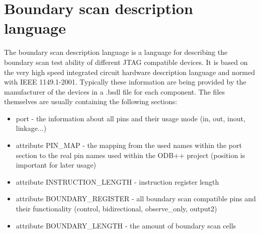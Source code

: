 	\section{Boundary scan description language}
The boundary scan description language is a language for describing the boundary scan test ability of different \ac{JTAG} compatible devices. It is based on the very high speed integrated circuit hardware description language and normed with IEEE 1149.1-2001. Typically these information are being provided by the manufacturer of the devices in a .bsdl file for each component.\cite{.3252021b} The files themselves are usually containing the following sections:
\begin{itemize}
	\item port - the information about all pins and their usage mode (in, out, inout, linkage...)
	\item attribute PIN\_MAP - the mapping from the used names within the port section to the real pin names used within the \ac{ODB}++ project (position is important for later usage)
	\item attribute INSTRUCTION\_LENGTH - instruction register length
	\item attribute BOUNDARY\_REGISTER - all boundary scan compatible pins and their functionality (control, bidirectional, observe\_only, output2)
	\item attribute BOUNDARY\_LENGTH - the amount of boundary scan cells
\end{itemize}

